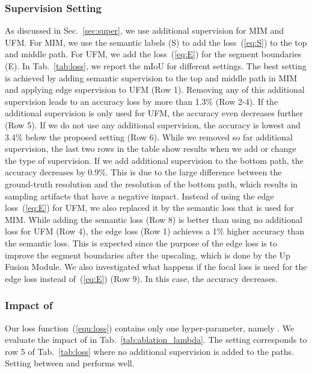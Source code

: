 \documentclass[letterpaper, 10 pt, journal, twoside]{ieeetran}
\newcommand{\tabref}[1]{Tab.~\ref{#1}}
\newcommand{\secref}[1]{Sec.~\ref{#1}}
\newcommand{\equref}[1]{~(\ref{#1})}
\begin{document}
\subsubsection{Supervision Setting}
As discussed in \secref{sec:super}, we use additional supervision for MIM and UFM. For MIM, we use the semantic labels (S) to add the loss\equref{eq:S} to the top and middle path. For UFM, we add the loss\equref{eq:E} for the segment boundaries (E). In \tabref{tab:loss}, we report the mIoU for different settings. The best setting is achieved by adding semantic supervision to the top and middle path in MIM and applying edge supervision to UFM (Row 1). Removing any of this additional supervision leads to an accuracy loss by more than 1.3\% (Row 2-4). If the additional supervision is only used for UFM, the accuracy even decreases further (Row 5). If we do not use any additional supervision, the accuracy is lowest and 3.4\% below the proposed setting (Row 6). While we removed so far additional supervision, the last two rows in the table show results when we add or change the type of supervision. If we add additional supervision to the bottom path, the accuracy decreases by 0.9\%. This is due to the large difference between the ground-truth resolution and the resolution of the bottom path, which results in sampling artifacts that have a negative impact.   
Instead of using the edge loss\equref{eq:E} for UFM, we also replaced it by the semantic loss that is used for MIM. While adding the semantic loss (Row 8) is better than using no additional loss for UFM (Row 4), the edge loss (Row 1) achieves a 1\% higher accuracy than the semantic loss.
This is expected
since the purpose of the edge loss is to improve the segment
boundaries after the upscaling, which is done by the Up
Fusion Module.
We also investigated what happens if the focal loss \cite{lin2017focal} is used for the edge loss instead of\equref{eq:E} (Row 9). In this case, the accuracy decreases.    













\subsubsection{Impact of }
Our loss function\equref{equ:loss} contains only one hyper-parameter, namely . We evaluate the impact of  in \tabref{tab:ablation_lambda}. The setting  corresponds to row 5 of \tabref{tab:loss} where no additional supervision is added to the paths. Setting  between  and  performs well. 
\end{document}
